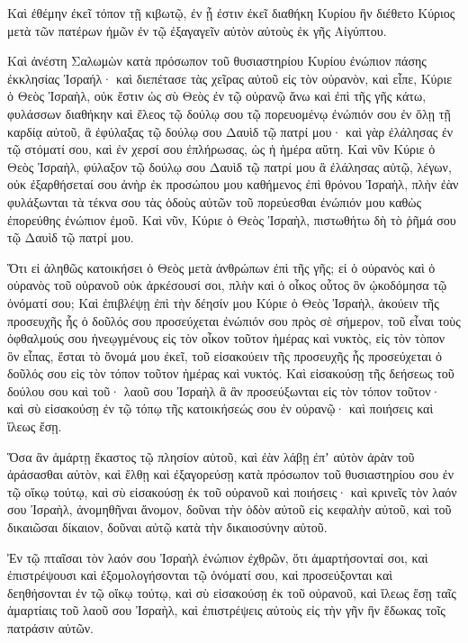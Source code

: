 {Καὶ ἐθέμην ἐκεῖ τόπον τῇ κιβωτῷ, ἐν ᾗ ἐστιν ἐκεῖ διαθήκη Κυρίου ἣν διέθετο Κύριος μετὰ τῶν πατέρων ἡμῶν ἐν τῷ ἐξαγαγεῖν αὐτὸν αὐτοὺς ἐκ γῆς Αἰγύπτου.
\par }{\PP {}Καὶ ἀνέστη Σαλωμὼν κατὰ πρόσωπον τοῦ θυσιαστηρίου Κυρίου ἐνώπιον πάσης ἐκκλησίας Ἰσραήλ· καὶ διεπέτασε τὰς χεῖρας αὐτοῦ εἰς τὸν οὐρανὸν,
καὶ εἶπε, Κύριε ὁ Θεὸς Ἰσραὴλ, οὐκ ἔστιν ὡς σὺ Θεὸς ἐν τῷ οὐρανῷ ἄνω καὶ ἐπὶ τῆς γῆς κάτω, φυλάσσων διαθήκην καὶ ἔλεος τῷ δούλῳ σου τῷ πορευομένῳ ἐνώπιόν σου ἐν ὅλῃ τῇ καρδίᾳ αὐτοῦ,
ἃ ἐφύλαξας τῷ δούλῳ σου Δαυὶδ τῷ πατρί μου· καὶ γὰρ ἐλάλησας ἐν τῷ στόματί σου, καὶ ἐν χερσί σου ἐπλήρωσας, ὡς ἡ ἡμέρα αὕτη.
Καὶ νῦν Κύριε ὁ Θεὸς Ἰσραὴλ, φύλαξον τῷ δούλῳ σου Δαυὶδ τῷ πατρί μου ἃ ἐλάλησας αὐτῷ, λέγων, οὐκ ἐξαρθήσεταί σου ἀνὴρ ἐκ προσώπου μου καθήμενος ἐπὶ θρόνου Ἰσραὴλ, πλὴν ἐὰν φυλάξωνται τὰ τέκνα σου τὰς ὁδοὺς αὐτῶν τοῦ πορεύεσθαι ἐνώπιόν μου καθὼς ἐπορεύθης ἐνώπιον ἐμοῦ.
Καὶ νῦν, Κύριε ὁ Θεὸς Ἰσραὴλ, πιστωθήτω δὴ τὸ ῥῆμά σου τῷ Δαυὶδ τῷ πατρί μου.
\par }{\PP {}Ὅτι εἰ ἀληθῶς κατοικήσει ὁ Θεὸς μετὰ ἀνθρώπων ἐπὶ τῆς γῆς; εἰ ὁ οὐρανὸς καὶ ὁ οὐρανὸς τοῦ οὐρανοῦ οὐκ ἀρκέσουσί σοι, πλὴν καὶ ὁ οἶκος οὗτος ὃν ᾠκοδόμησα τῷ ὀνόματί σου;
Καὶ ἐπιβλέψῃ ἐπὶ τὴν δέησίν μου Κύριε ὁ Θεὸς Ἰσραὴλ, ἀκούειν τῆς προσευχῆς ἧς ὁ δοῦλός σου προσεύχεται ἐνώπιόν σου πρὸς σὲ σήμερον,
τοῦ εἶναι τοὺς ὀφθαλμούς σου ἠνεῳγμένους εἰς τὸν οἶκον τοῦτον ἡμέρας καὶ νυκτὸς, εἰς τὸν τὸπον ὃν εἶπας, ἔσται τὸ ὄνομά μου ἐκεῖ, τοῦ εἰσακούειν τῆς προσευχῆς ἧς προσεύχεται ὁ δοῦλός σου εἰς τὸν τόπον τοῦτον ἡμέρας καὶ νυκτός.
Καὶ εἰσακούσῃ τῆς δεήσεως τοῦ δούλου σου καὶ τοῦ· λαοῦ σου Ἰσραὴλ ἃ ἂν προσεύξωνται εἰς τὸν τόπον τοῦτον· καὶ σὺ εἰσακούσῃ ἐν τῷ τόπῳ τῆς κατοικήσεώς σου ἐν οὐρανῷ· καὶ ποιήσεις καὶ ἵλεως ἔσῃ.
\par }{\PP {}Ὅσα ἂν ἁμάρτῃ ἕκαστος τῷ πλησίον αὐτοῦ, καὶ ἐὰν λάβῃ ἐπʼ αὐτὸν ἀρὰν τοῦ ἀράσασθαι αὐτὸν, καὶ ἔλθῃ καὶ ἐξαγορεύσῃ κατὰ πρόσωπον τοῦ θυσιαστηρίου σου ἐν τῷ οἴκῳ τούτῳ,
καὶ σὺ εἰσακούσῃ ἐκ τοῦ οὐρανοῦ καὶ ποιήσεις· καὶ κρινεῖς τὸν λαόν σου Ἰσραὴλ, ἀνομηθῆναι ἄνομον, δοῦναι τὴν ὁδὸν αὐτοῦ εἰς κεφαλὴν αὐτοῦ, καὶ τοῦ δικαιῶσαι δίκαιον, δοῦναι αὐτῷ κατὰ τὴν δικαιοσύνην αὐτοῦ.
\par }{\PP {}Ἐν τῷ πταῖσαι τὸν λαόν σου Ἰσραὴλ ἐνώπιον ἐχθρῶν, ὅτι ἁμαρτήσονταί σοι, καὶ ἐπιστρέψουσι καὶ ἐξομολογήσονται τῷ ὀνόματί σου, καὶ προσεύξονται καὶ δεηθήσονται ἐν τῷ οἴκῳ τούτῳ,
καὶ σὺ εἰσακούσῃ ἐκ τοῦ οὐρανοῦ, καὶ ἵλεως ἔσῃ ταῖς ἁμαρτίαις τοῦ λαοῦ σου Ἰσραὴλ, καὶ ἐπιστρέψεις αὐτοὺς εἰς τὴν γῆν ἣν ἔδωκας τοῖς πατράσιν αὐτῶν.
}
